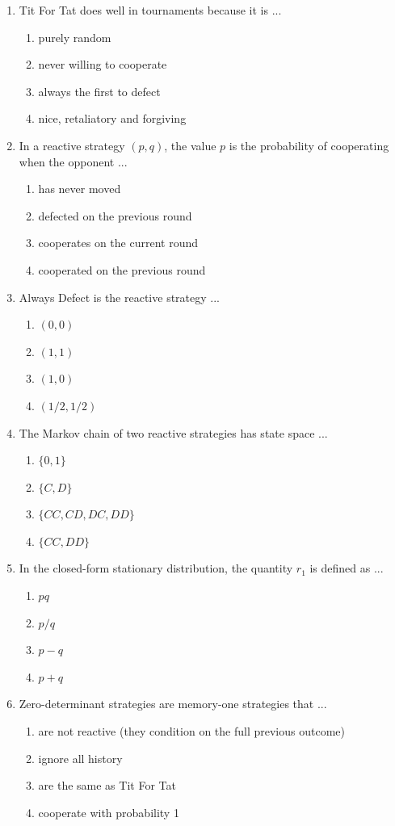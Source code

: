 \documentclass[11pt]{article}
\begin{document}
\begin{enumerate}[itemsep=6pt]
  \item Tit For Tat does well in tournaments because it is ...
  \begin{enumerate}
    \item purely random
    \item never willing to cooperate
    \item always the first to defect
    \item nice, retaliatory and forgiving
  \end{enumerate}
  \item In a reactive strategy \((p, q)\), the value \(p\) is the probability of cooperating when the opponent ...
  \begin{enumerate}
    \item has never moved
    \item defected on the previous round
    \item cooperates on the current round
    \item cooperated on the previous round
  \end{enumerate}
  \item Always Defect is the reactive strategy ...
  \begin{enumerate}
    \item \((0, 0)\)
    \item \((1, 1)\)
    \item \((1, 0)\)
    \item \((1/2, 1/2)\)
  \end{enumerate}
  \item The Markov chain of two reactive strategies has state space ...
  \begin{enumerate}
    \item \(\{0, 1\}\)
    \item \(\{C, D\}\)
    \item \(\{CC, CD, DC, DD\}\)
    \item \(\{CC, DD\}\)
  \end{enumerate}
  \item In the closed-form stationary distribution, the quantity \(r_1\) is defined as ...
  \begin{enumerate}
    \item \(pq\)
    \item \(p / q\)
    \item \(p - q\)
    \item \(p + q\)
  \end{enumerate}
  \item Zero-determinant strategies are memory-one strategies that ...
  \begin{enumerate}
    \item are not reactive (they condition on the full previous outcome)
    \item ignore all history
    \item are the same as Tit For Tat
    \item cooperate with probability 1
  \end{enumerate}
\end{enumerate}
\end{document}
